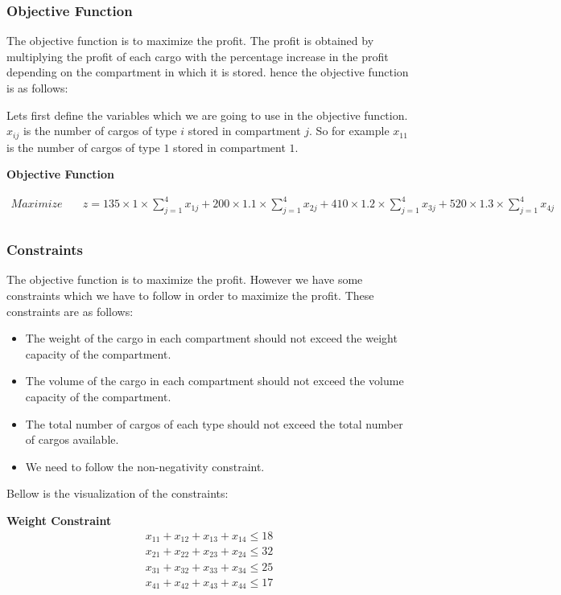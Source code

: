 \documentclass[unicode,11pt,a4paper,oneside,numbers=endperiod,openany]{scrartcl}
\begin{document}
\subsubsection{Objective Function}
The objective function is to maximize the profit. The profit is obtained by multiplying the profit of each cargo with the percentage increase in the profit depending on the compartment in which it is stored. hence the objective function is as follows:

Lets first define the variables which we are going to use in the objective function. $x_{ij}$ is the number of cargos of type $i$ stored in compartment $j$. So for example $x_{11}$ is the number of cargos of type $1$ stored in compartment $1$. 

\textbf{Objective Function}

\begin{equation}
	\begin{aligned}
		Maximize \quad & z = 135 \times 1 \times \sum_{j=1}^{4} x_{1j} + 200 \times 1.1 \times \sum_{j=1}^{4} x_{2j} + 410 \times 1.2 \times \sum_{j=1}^{4} x_{3j} + 520 \times 1.3 \times \sum_{j=1}^{4} x_{4j} \\
	\end{aligned}
	\label{eq:2.1.1}
\end{equation}

\subsubsection{Constraints}
The objective function is to maximize the profit. However we have some constraints which we have to follow in order to maximize the profit. These constraints are as follows:

\begin{itemize}
	\item The weight of the cargo in each compartment should not exceed the weight capacity of the compartment.
	\item The volume of the cargo in each compartment should not exceed the volume capacity of the compartment.
	\item The total number of cargos of each type should not exceed the total number of cargos available.
	\item We need to follow the non-negativity constraint.
\end{itemize}

Bellow is the visualization of the constraints:

\textbf{Weight Constraint}
\begin{equation}
	\begin{aligned}
		x_{11} + x_{12} + x_{13} + x_{14} \leq 18 \\
		x_{21} + x_{22} + x_{23} + x_{24} \leq 32 \\
		x_{31} + x_{32} + x_{33} + x_{34} \leq 25 \\
		x_{41} + x_{42} + x_{43} + x_{44} \leq 17 \\
	\end{aligned}
	\label{eq:2.1.2}
\end{equation}
\end{document}
